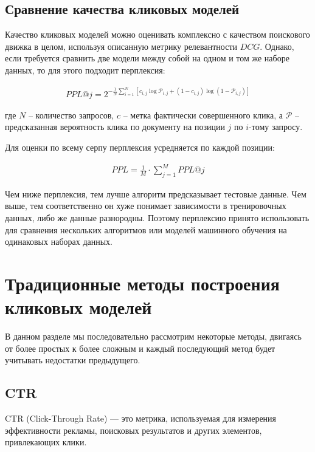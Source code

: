 \documentclass[diploma]{nanolab2015}
\begin{document}
\subsection{Сравнение качества кликовых моделей}
Качество кликовых моделей можно оценивать комплексно с качеством поискового движка в целом, используя описанную метрику релевантности $DCG$. Однако, если требуется сравнить две модели между собой на одном и том же наборе данных, то для этого подходит перплексия:

\begin{align}
  PPL@j = 2^{-\frac{1}{N}\sum_{i=1}^{N} \left[c_{i,j}\log\mathcal{P}_{i,j} + (1 - c_{i,j})\log(1 - \mathcal{P}_{i,j})\right]}
\end{align}

где $N$ -- количество запросов, $c$ -- метка фактически совершенного клика, а $\mathcal{P}$ -- предсказанная вероятность клика по документу на позиции $j$ по $i$-тому запросу.

Для оценки по всему серпу перплексия усредняется по каждой позиции:

\begin{align}
  PPL = \frac{1}{M} \cdot \sum_{j=1}^{M} PPL@j
\end{align}

Чем ниже перплексия, тем лучше алгоритм предсказывает тестовые данные. Чем выше, тем соответственно он хуже понимает зависимости в тренировочных данных, либо же данные разнородны. Поэтому перплексию принято использовать для сравнения нескольких алгоритмов или моделей машинного обучения на одинаковых наборах данных.

\section{Традиционные методы построения кликовых моделей}
В данном разделе мы последовательно рассмотрим некоторые методы, двигаясь от более простых к более сложным и каждый последующий метод будет учитывать недостатки предыдущего.
\subsection{CTR}
CTR (Click-Through Rate) — это метрика, используемая для измерения эффективности рекламы, поисковых результатов и других элементов, привлекающих клики. %
\end{document}
